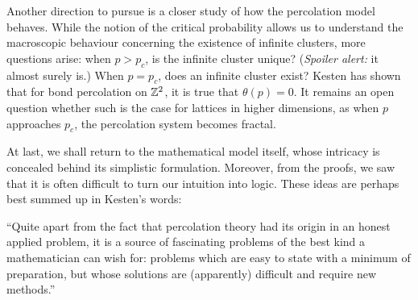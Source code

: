 \documentclass[a4paper, 12pt]{article}
\begin{document}
Another direction to pursue is a closer study of how the percolation model behaves. While the notion of the critical probability allows us to understand the macroscopic behaviour concerning the existence of infinite clusters, more questions arise: when $p > p_c$, is the infinite cluster unique? (\textit{Spoiler alert:} it almost surely is.) When $p = p_c$, does an infinite cluster exist? Kesten \autocite*[42]{kesten_1980} has shown that for bond percolation on $\mathbb{Z}^2$, it is true that $\theta(p) = 0$. It remains an open question whether such is the case for lattices in higher dimensions, as when $p$ approaches $p_c$, the percolation system becomes fractal.

At last, we shall return to the mathematical model itself, whose intricacy is concealed behind its simplistic formulation. Moreover, from the proofs, we saw that it is often difficult to turn our intuition into logic. These ideas are perhaps best summed up in Kesten's words:

\begin{displayquote}
``Quite apart from the fact that percolation theory had its origin in an honest applied problem, it is a source of fascinating problems of the best kind a mathematician can wish for: problems which are easy to state with a minimum of preparation, but whose solutions are (apparently) difficult and require new methods.''
\end{displayquote}

\printbibliography
\end{document}
